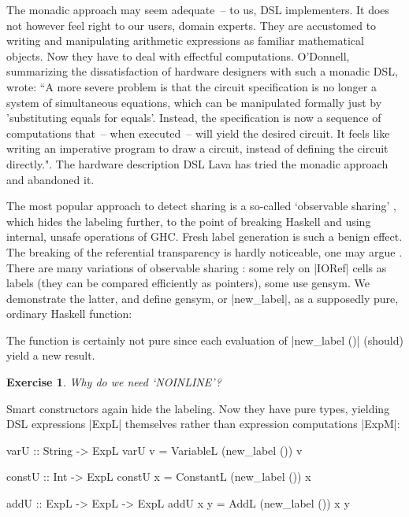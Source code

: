 \documentclass[submission,copyright,creativecommons]{eptcs}
\newtheorem{Exercise}{Exercise} \newcommand\aside[1]{}
\begin{document}
The monadic approach may seem adequate~-- to us, DSL implementers. It
does not however feel right to our users, domain experts. They are
accustomed to writing and manipulating arithmetic expressions as
familiar mathematical objects. Now they have to deal with effectful
computations. O'Donnell, summarizing the dissatisfaction of hardware
designers with such a monadic DSL, wrote: ``A more severe problem is
that the circuit specification is no longer a system of simultaneous
equations, which can be manipulated formally just by 'substituting
equals for equals'. Instead, the specification is now a sequence of
computations that~-- when executed~-- will yield the desired
circuit. It feels like writing an imperative program to draw a
circuit, instead of defining the circuit
directly."\cite{ODonnell-dagstuhl}. The hardware description DSL Lava
has tried the monadic approach and abandoned it.

The most popular approach to detect sharing is a so-called `observable
sharing' \cite{claessen-observable}, which hides the labeling further,
to the point of breaking Haskell and using internal, unsafe operations
of GHC. Fresh label generation is such a benign effect. The
breaking of the referential transparency is hardly noticeable, one
may argue \cite{claessen-observable,Naylor-obs-sharing}. There are
many variations of observable sharing
\cite{acosta-hardware,claessen-observable,Naylor-obs-sharing}: some
rely on |IORef| cells as labels (they can be compared efficiently as
pointers), some use gensym. We demonstrate the latter, and define
gensym, or |new_label|, as a supposedly pure, ordinary Haskell
function:
The function is certainly not pure since each evaluation of
|new_label ()| (should) yield a new result.
\begin{Exercise}
Why do we need `NOINLINE'?
\end{Exercise}

Smart constructors again hide the labeling. Now they have pure types, 
yielding DSL expressions |ExpL| themselves
rather than expression computations |ExpM|:
\begin{code}
varU :: String -> ExpL
varU v = VariableL (new_label ()) v

constU :: Int -> ExpL
constU x = ConstantL (new_label ()) x

addU :: ExpL -> ExpL -> ExpL
addU x y = AddL (new_label ()) x y
\end{code}
\end{document}
